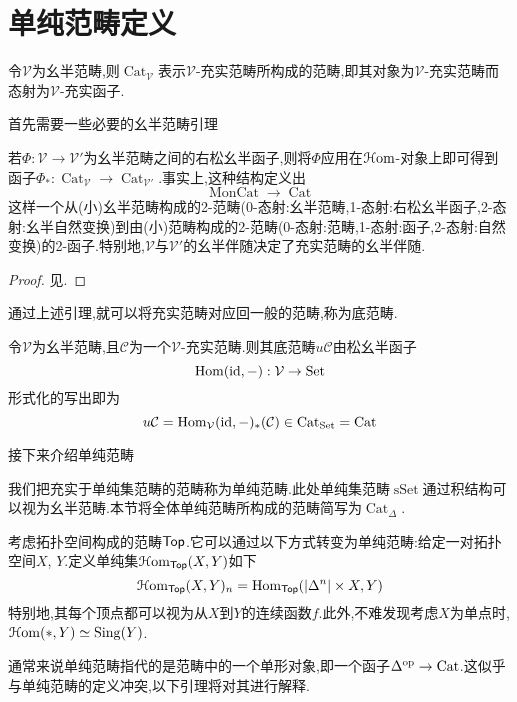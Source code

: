 \section{单纯范畴定义}
\begin{notation}
    令$\mathcal{V}$为幺半范畴,则$\operatorname{Cat}_{\mathcal{V}}$表示$\mathcal{V}$-充实范畴所构成的范畴,即其对象为$\mathcal{V}$-充实范畴而态射为$\mathcal{V}$-充实函子.
\end{notation}
首先需要一些必要的幺半范畴引理
\begin{lemma}
    若$\Phi : \mathcal{V} \to \mathcal{V}'$为幺半范畴之间的右松幺半函子,则将$\Phi$应用在$\EuScript{H}\mathrm{om}$-对象上即可得到函子$\Phi_* : \operatorname{Cat}_{\mathcal{V}}\to \operatorname{Cat}_{\mathcal{V}'}$.事实上,这种结构定义出
    \[
        \operatorname{MonCat} \to \operatorname{Cat}
    \]
    这样一个从(小)幺半范畴构成的2-范畴(0-态射:幺半范畴,1-态射:右松幺半函子,2-态射:幺半自然变换)到由(小)范畴构成的2-范畴(0-态射:范畴,1-态射:函子,2-态射:自然变换)的2-函子.特别地,$\mathcal{V}$与$\mathcal{V}'$的幺半伴随决定了充实范畴的幺半伴随.
\end{lemma}
\begin{proof}
    见\parencite[Lemma 1.2.37]{Land}.
\end{proof}
通过上述引理,就可以将充实范畴对应回一般的范畴,称为底范畴.
\begin{definition}\label{定义:底范畴}
    令$\mathcal{V}$为幺半范畴,且$\mathcal{C}$为一个$\mathcal{V}$-充实范畴.则其底范畴$u\mathcal{C}$由松幺半函子
    \[
        \operatorname{Hom}(\mathrm{id},-):\mathcal{V} \to\operatorname{Set}
    \]
    形式化的写出即为
    \[
        u\mathcal{C} = \operatorname{Hom}_{\mathcal{V}}(\mathrm{id},-)_*(\mathcal{C})\in \operatorname{Cat}_{\operatorname{Set}}=\operatorname{Cat}
    \]
\end{definition}
接下来介绍单纯范畴
\begin{definition}[单纯范畴]
    我们把充实于单纯集范畴的范畴称为单纯范畴.此处单纯集范畴$\operatorname{sSet}$通过积结构可以视为幺半范畴.本节将全体单纯范畴所构成的范畴简写为$\operatorname{Cat}_{\Delta}$.
\end{definition}
\begin{example}
    考虑拓扑空间构成的范畴$\mathsf{Top}$.它可以通过以下方式转变为单纯范畴:给定一对拓扑空间$X$, $Y$.定义单纯集$\EuScript{H}\mathrm{om}_{\mathsf{Top}}(X,Y)$如下
    \[
    \EuScript{H}\mathrm{om}_{\mathsf{Top}}(X,Y)_n = \operatorname{Hom}_{\mathsf{Top}}(|\Delta^n|\times X,Y)
    \]
    特别地,其每个顶点都可以视为从$X$到$Y$的连续函数$f$.此外,不难发现考虑$X$为单点时, $\EuScript{H}\mathrm{om}(*,Y) \simeq \operatorname{Sing}(Y)$.
\end{example}
\begin{remark}
    通常来说单纯范畴指代的是范畴中的一个单形对象,即一个函子$\Delta^{\operatorname{op}}\to\operatorname{Cat}$.这似乎与单纯范畴的定义冲突,以下引理将对其进行解释.
\end{remark}


